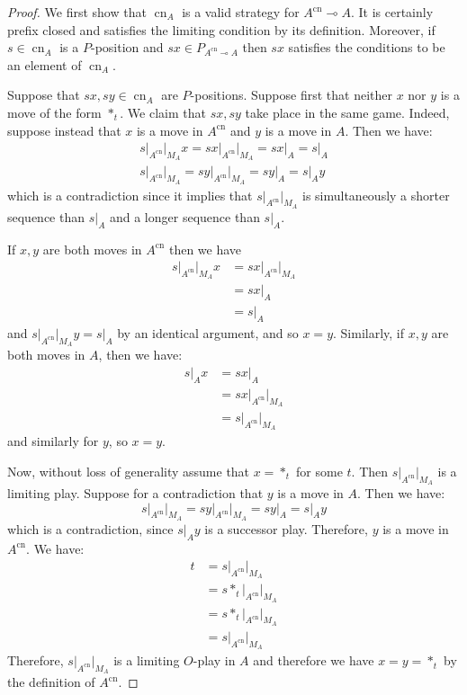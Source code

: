 \documentclass[11pt]{article} %
\theoremstyle{plain} %
\theoremstyle{definition} %
\theoremstyle{note}
\theoremstyle{exercisestyle}
\renewcommand{\implies}{\multimap}
\DeclareMathOperator{\cn}{cn}
\begin{document}
\begin{proof}
  We first show that $\cn_A$ is a valid strategy for $A^{\cn}\implies A$.  It is certainly prefix closed and satisfies the limiting condition by its definition.  Moreover, if $s\in\cn_A$ is a $P$-position and $sx\in P_{A^{\cn}\implies A}$ then $sx$ satisfies the conditions to be an element of $\cn_A$.

  Suppose that $sx, sy\in \cn_A$ are $P$-positions.  Suppose first that neither $x$ nor $y$ is a move of the form $*_t$.  We claim that $sx,sy$ take place in the same game.  Indeed, suppose instead that $x$ is a move in $A^{\cn}$ and $y$ is a move in $A$.  Then we have:
  \begin{gather*}
    s\vert_{A^{\cn}}\vert_{M_A}x = sx\vert_{A^{\cn}}\vert_{M_A} = sx\vert_A = s\vert_A\\
    s\vert_{A^{\cn}}\vert_{M_A} = sy\vert_{A^{\cn}}\vert_{M_A} = sy\vert_A = s\vert_Ay
  \end{gather*}
  which is a contradiction since it implies that $s\vert_{A^{\cn}}\vert_{M_A}$ is simultaneously a shorter sequence than $s\vert_A$ and a longer sequence than $s\vert_A$.

  If $x,y$ are both moves in $A^{\cn}$ then we have
  \begin{align*}
    s\vert_{A^{\cn}}\vert_{M_A}x &= sx\vert_{A^{\cn}}\vert_{M_A} \\
    & = sx\vert_A\\
    & = s\vert_A
  \end{align*}
  and $s\vert_{A^{\cn}}\vert_{M_A}y=s\vert_A$ by an identical argument, and so $x=y$.  Similarly, if $x,y$ are both moves in $A$, then we have:
  \begin{align*}
    s\vert_Ax &= sx\vert_A \\
    &= sx\vert_{A^{\cn}}\vert_{M_A}\\
    &= s\vert_{A^{\cn}}\vert_{M_A}
  \end{align*}
  and similarly for $y$, so $x=y$.

  Now, without loss of generality assume that $x=*_t$ for some $t$.  Then $s\vert_{A^{\cn}}\vert_{M_A}$ is a limiting play.  Suppose for a contradiction that $y$ is a move in $A$.  Then we have:
  \[
    s\vert_{A^{\cn}}\vert_{M_A} = sy\vert_{A^{\cn}}\vert_{M_A}=sy\vert_A = s\vert_Ay
    \]
  which is a contradiction, since $s\vert_Ay$ is a successor play.  Therefore, $y$ is a move in $A^{\cn}$.  We have:
  \begin{align*}
    t &= s\vert_{A^{\cn}}\vert_{M_A}\\
    &= s*_t\vert_{A^{\cn}}\vert_{M_A}\\
    &= s*_t\vert_{A^{\cn}}\vert_{M_A}\\
    &= s\vert_{A^{\cn}}\vert_{M_A}
  \end{align*}
  Therefore, $s\vert_{A^{\cn}}\vert_{M_A}$ is a limiting $O$-play in $A$ and therefore we have $x=y=*_t$ by the definition of $A^{\cn}$.  


\end{proof}
\end{document}
